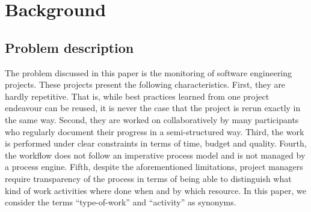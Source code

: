 \section{Background}
\label{sec:background}


\subsection{Problem description}
\label{sec:problem}

The problem discussed in this paper is the monitoring of software engineering projects. 
These projects present the following characteristics. First, they are hardly repetitive. That is, while best practices learned from one project endeavour can be reused, it is never the case that the project is rerun exactly in the same way. Second, they are worked on collaboratively by many participants who regularly document their progress in a semi-structured way. %
Third, the work is performed under clear constraints in terms of time, budget and quality. Fourth, the workflow does not follow an imperative process model and is not managed by a process engine. Fifth, despite the aforementioned limitations, project managers require transparency of the process in terms of being able to distinguish what kind of work activities where done when and by which resource. In this paper, we consider the terms ``type-of-work'' and ``activity'' as synonyms.


